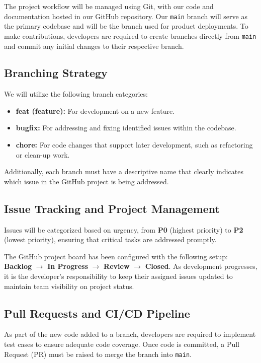 \documentclass{article}
\begin{document}
The project workflow will be managed using Git, with our code and documentation hosted in our GitHub repository. Our \texttt{main} branch will serve as the primary codebase and will be the branch used for product deployments. To make contributions, developers are required to create branches directly from \texttt{main} and commit any initial changes to their respective branch.

\subsection{Branching Strategy}
We will utilize the following branch categories:
\begin{itemize}
    \item \textbf{feat (feature):} For development on a new feature.
    \item \textbf{bugfix:} For addressing and fixing identified issues within the codebase.
    \item \textbf{chore:} For code changes that support later development, such as refactoring or clean-up work.
\end{itemize}
Additionally, each branch must have a descriptive name that clearly indicates which issue in the GitHub project is being addressed.

\subsection{Issue Tracking and Project Management}
Issues will be categorized based on urgency, from \textbf{P0} (highest priority) to \textbf{P2} (lowest priority), ensuring that critical tasks are addressed promptly. 

The GitHub project board has been configured with the following setup: \textbf{Backlog} $\rightarrow$ \textbf{In Progress} $\rightarrow$ \textbf{Review} $\rightarrow$ \textbf{Closed}. As development progresses, it is the developer's responsibility to keep their assigned issues updated to maintain team visibility on project status.

\subsection{Pull Requests and CI/CD Pipeline}
As part of the new code added to a branch, developers are required to implement test cases to ensure adequate code coverage. Once code is committed, a Pull Request (PR) must be raised to merge the branch into \texttt{main}. 
\end{document}
